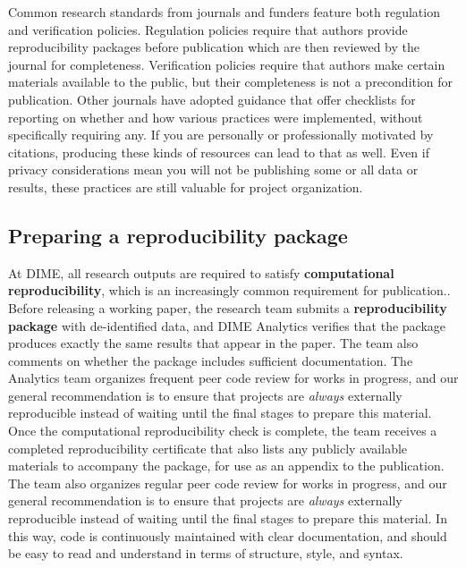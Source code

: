 Common research standards from journals and funders feature both
regulation and verification policies.
Regulation policies require that authors
provide reproducibility packages before publication
which are then reviewed by the journal for completeness.
Verification policies require that authors
make certain materials available to the public,
but their completeness is not a precondition for publication.
Other journals have adopted guidance that offer checklists
for reporting on whether and how various practices were implemented,
without specifically requiring any.
If you are personally or professionally motivated by citations,
producing these kinds of resources can lead to that as well.
Even if privacy considerations mean 
you will not be publishing some or all data or results,
these practices are still valuable for project organization.


\subsection{Preparing a reproducibility package}

At DIME, all research outputs are required to satisfy \textbf{computational reproducibility},
which is an increasingly common requirement for publication..
Before releasing a working paper,
the research team submits a \textbf{reproducibility package} with de-identified data,
and DIME Analytics verifies that the package produces
exactly the same results that appear in the paper.
The team also comments on whether the package includes sufficient documentation.
The Analytics team organizes frequent peer code review for works in progress,
and our general recommendation is to ensure that projects
are \textit{always} externally reproducible
instead of waiting until the final stages to prepare this material.
Once the computational reproducibility check is complete,
the team receives a completed reproducibility certificate
that also lists any publicly available materials to accompany the package,
for use as an appendix to the publication.
The team also organizes regular peer code review for works in progress,
and our general recommendation is to ensure that projects
are \textit{always} externally reproducible
instead of waiting until the final stages to prepare this material.
In this way, code is continuously maintained with clear documentation,
and should be easy to read and understand in terms of structure, style, and syntax.

